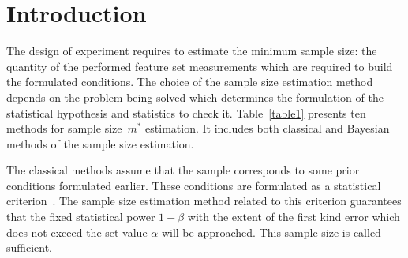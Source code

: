 \documentclass[
11pt,%
tightenlines,%
twoside,%
onecolumn,%
nofloats,%
nobibnotes,%
nofootinbib,%
superscriptaddress,%
noshowpacs,%
centertags]%
{revtex4}
\begin{document}
\section{Introduction}
The design of experiment requires to estimate the minimum sample size: the quantity of the performed feature set measurements which are required to build the formulated conditions. The choice of the sample size estimation method depends on the problem being solved which determines the formulation of the statistical hypothesis and statistics to check it. Table~\ref{table1} presents ten methods for sample size~$m^*$ estimation. It includes both classical and Bayesian methods of the sample size estimation.

The classical methods assume that the sample corresponds to some prior conditions formulated earlier. These conditions are formulated as a statistical criterion~\cite{self1988, self1992, shieh2000, demidenko2007}. The sample size estimation method related to this criterion guarantees that the fixed statistical power $1-\beta$ with the extent of the first kind error which does not exceed the set value $\alpha$ will be approached. This sample size is called sufficient.
\end{document}
